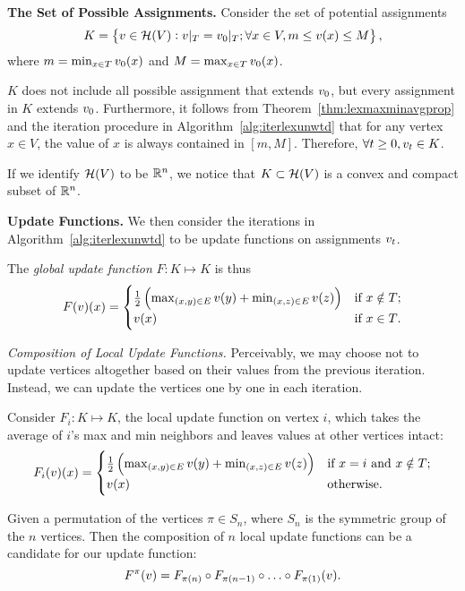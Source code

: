 \documentclass[12pt]{amsart}
\begin{document}
\textbf{The Set of Possible Assignments.}
Consider the set of potential assignments $$K=\left\{v\in\mathcal{H}(V) : v|_T = v_0|_T; \forall x\in V, m\leq v(x)\leq M\right\},$$ 
where $m=\min_{x\in T}v_0(x)$ and $M=\max_{x\in T}v_0(x)$.

$K$ does not include all possible assignment that extends $v_0$, but every assignment in $K$ extends $v_0$. Furthermore, it follows from Theorem~\ref{thm:lexmaxminavgprop} and the iteration procedure in Algorithm~\ref{alg:iterlexunwtd} that for any vertex $x\in V$, the value of $x$ is always contained in $[m,M]$. Therefore, $\forall t\geq 0, v_t\in K$.

If we identify $\mathcal{H}(V)$ to be $\mathbb R^n$, we notice that $K\subset \mathcal{H}(V)$ is a convex and compact subset of $\mathbb R^n$.

\textbf{Update Functions.}
We then consider the iterations in Algorithm~\ref{alg:iterlexunwtd} to be update functions on assignments $v_t$.

The \emph{global update function} $F: K\mapsto K$ is thus
\begin{equation*}
F(v)(x) =  \begin{cases}
\frac{1}{2}\left({\max_{(x,y)\in E}v(y)+\min_{(x,z)\in E}v(z)}\right) &\text{if $x\notin T$;} \\
v(x) &\text{if $x\in T$.}
\end{cases}
\end{equation*}

\textit{Composition of Local Update Functions.}
Perceivably, we may choose not to update vertices altogether based on their values from the previous iteration. Instead, we can update the vertices one by one in each iteration.

Consider $F_i: K\mapsto K$, the local update function on vertex $i$, which takes the average of $i$'s max and min neighbors and leaves values at other vertices intact:
\begin{equation*}
F_i(v)(x) = \begin{cases}
\frac{1}{2}\left({\max_{(x,y)\in E}v(y)+\min_{(x,z)\in E}v(z)}\right) &\text{if $x = i$ and 
$x\notin T$;}\\
v(x) &\text{otherwise.}
\end{cases}
\end{equation*}

Given a permutation of the vertices $\pi\in S_n$, where $S_n$ is the symmetric group of the $n$ vertices. Then the composition of $n$ local update functions can be a candidate for our update function: $$F^\pi(v) = F_{\pi(n)}\circ F_{\pi(n-1)} \circ \hdots \circ F_{\pi(1)}(v).$$
\end{document}
